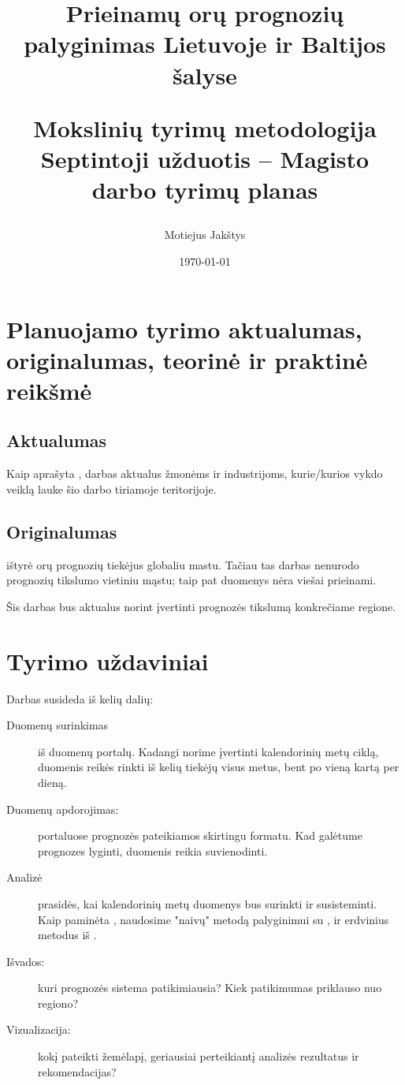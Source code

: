 \documentclass{article}
\title{
    Prieinamų orų prognozių palyginimas Lietuvoje ir Baltijos šalyse \\ \vspace{4mm}

    \large Mokslinių tyrimų metodologija\\
    Septintoji užduotis -- Magisto darbo tyrimų planas
}
\author{Motiejus Jakštys}
\date{\today}
\begin{document}
\maketitle

\newpage

\section{Planuojamo tyrimo aktualumas, originalumas, teorinė ir praktinė reikšmė}

\subsection{Aktualumas}

Kaip aprašyta \cite{motiejus-task6}, darbas aktualus žmonėms ir industrijoms,
kurie/kurios vykdo veiklą lauke šio darbo tiriamoje teritorijoje.

\subsection{Originalumas}

\cite{rose2017analysis} ištyrė orų prognozių tiekėjus globaliu mastu. Tačiau tas darbas
nenurodo prognozių tikslumo vietiniu mąstu; taip pat duomenys nėra viešai prieinami.

Šis darbas bus aktualus norint įvertinti prognozės tikslumą konkrečiame regione.

\section{Tyrimo uždaviniai}
Darbas susideda iš kelių dalių:
\begin{description}
    \item[Duomenų surinkimas] iš duomenų portalų. Kadangi norime įvertinti
        kalendorinių metų ciklą, duomenis reikės rinkti iš kelių tiekėjų visus
        metus, bent po vieną kartą per dieną.
    \item[Duomenų apdorojimas:] portaluose prognozės pateikiamos skirtingu
        formatu. Kad galėtume prognozes lyginti, duomenis reikia suvienodinti.
    \item[Analizė] prasidės, kai kalendorinių metų duomenys bus surinkti
        ir susisteminti. Kaip paminėta \cite{motiejus-task6}, naudosime "naivų"
        metodą palyginimui su \cite{rose2017analysis}, ir erdvinius metodus iš
        \cite{verification2015}.
    \item[Išvados:] kuri prognozės sistema patikimiausia? Kiek patikimumas
        priklauso nuo regiono?
    \item[Vizualizacija:] kokį pateikti žemėlapį, geriausiai perteikiantį
        analizės rezultatus ir rekomendacijas?
\end{description}
\end{document}
